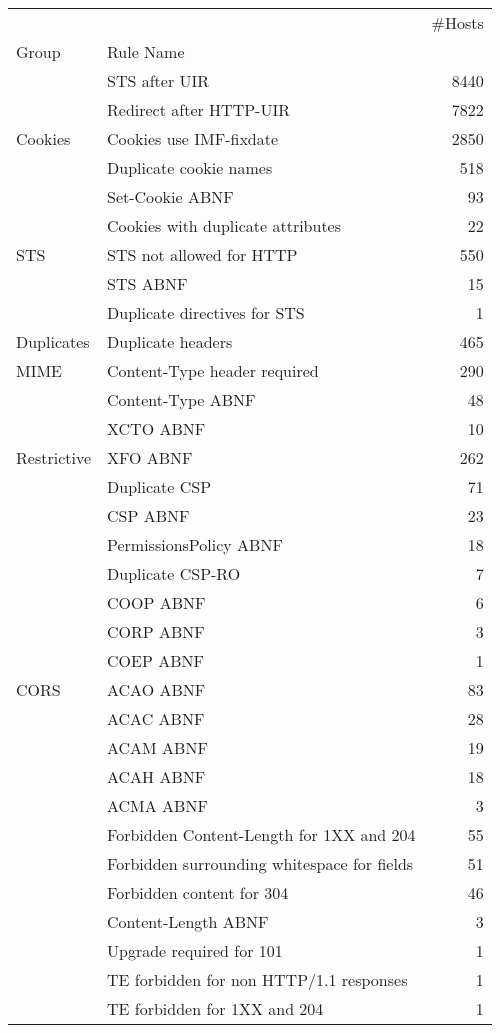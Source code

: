 \begin{tabular}{llr}
\toprule
     &                              &  \#Hosts \\
Group & Rule Name &          \\
\midrule
     & STS after UIR\rlap{*} &     8440 \\
     & Redirect after HTTP-UIR &     7822 \\
Cookies & Cookies use IMF-fixdate &     2850 \\
     & Duplicate cookie names &      518 \\
     & Set-Cookie ABNF &       93 \\
     & Cookies with duplicate attributes &       22 \\
STS & STS not allowed for HTTP &      550 \\
     & STS ABNF &       15 \\
     & Duplicate directives for STS &        1 \\
Duplicates & Duplicate headers &      465 \\
MIME & Content-Type header required &      290 \\
     & Content-Type ABNF &       48 \\
     & XCTO ABNF &       10 \\
Restrictive & XFO ABNF &      262 \\
     & Duplicate CSP &       71 \\
     & CSP ABNF &       23 \\
     & PermissionsPolicy ABNF &       18 \\
     & Duplicate CSP-RO &        7 \\
     & COOP ABNF &        6 \\
     & CORP ABNF &        3 \\
     & COEP ABNF &        1 \\
CORS & ACAO ABNF &       83 \\
     & ACAC ABNF &       28 \\
     & ACAM ABNF &       19 \\
     & ACAH ABNF &       18 \\
     & ACMA ABNF &        3 \\
     & Forbidden Content-Length for 1XX and 204 &       55 \\
     & Forbidden surrounding whitespace for fields &       51 \\
     & Forbidden content for 304 &       46 \\
     & Content-Length ABNF &        3 \\
     & Upgrade required for 101 &        1 \\
     & TE forbidden for non HTTP/1.1 responses &        1 \\
     & TE forbidden for 1XX and 204 &        1 \\
\bottomrule
\end{tabular}
